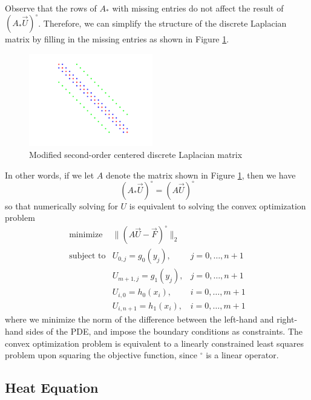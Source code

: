 \documentclass[conference]{IEEEtran}
\begin{document}
Observe that the rows of $A_*$ with missing entries do not affect the result of $(A_* \vec{U})^\circ$. Therefore, we can simplify the structure of the discrete Laplacian matrix by filling in the missing entries as shown in Figure \ref{fig:modified-discrete-laplacian}.
\begin{figure}[t]
  \begin{center}
    \includegraphics[width=0.48\textwidth]{figures/modified-discrete-laplacian}
    \caption{Modified second-order centered discrete Laplacian matrix}
    \label{fig:modified-discrete-laplacian}
  \end{center}
\end{figure}
In other words, if we let $A$ denote the matrix shown in Figure \ref{fig:modified-discrete-laplacian}, then we have
\begin{equation}
  (A_* \vec{U})^\circ = (A \vec{U})^\circ
\end{equation}
so that numerically solving for $U$ is equivalent to solving the convex optimization problem
\begin{equation}
  \begin{array}{lll}
    \text{minimize} & \|(A \vec{U} - \vec{F})^\circ\|_2 \\
    \text{subject to} & U_{0,j} = g_0(y_j), & j = 0,\ldots,n+1 \\
    & U_{m+1,j} = g_1(y_j), & j = 0,\ldots,n+1 \\
    & U_{i,0} = h_0(x_i), & i = 0,\ldots,m+1 \\
    & U_{i,n+1} = h_1(x_i), & i = 0,\ldots,m+1
  \end{array}
\end{equation}
where we minimize the norm of the difference between the left-hand and right-hand sides of the PDE, and impose the boundary conditions as constraints. The convex optimization problem is equivalent to a linearly constrained least squares problem upon squaring the objective function, since ${}^\circ$ is a linear operator.

\subsection{Heat Equation}
\end{document}
